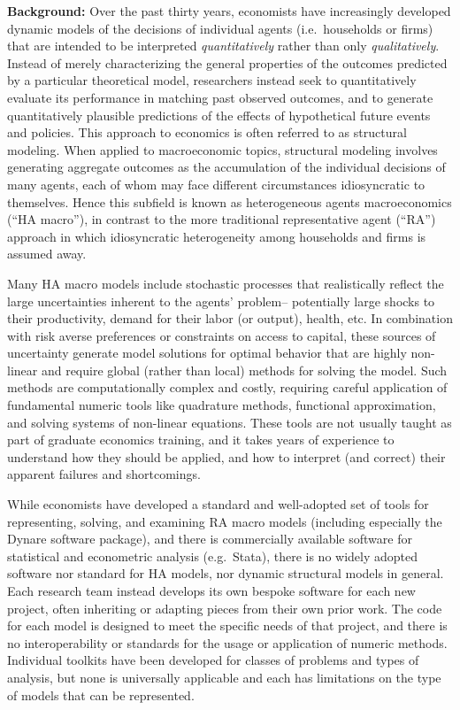 \documentclass[12pt,pdftex,letterpaper]{article}
\begin{document}
\noindent \textbf{Background:} Over the past thirty years, economists have increasingly developed dynamic models of the decisions of individual agents (i.e.\ households or firms) that are intended to be interpreted \textit{quantitatively} rather than only \textit{qualitatively}. Instead of merely characterizing the general properties of the outcomes predicted by a particular theoretical model, researchers instead seek to quantitatively evaluate its performance in matching past observed outcomes, and to generate quantitatively plausible predictions of the effects of hypothetical future events and policies. This approach to economics is often referred to as structural modeling. When applied to macroeconomic topics, structural modeling involves generating aggregate outcomes as the accumulation of the individual decisions of many agents, each of whom may face different circumstances idiosyncratic to themselves. Hence this subfield is known as heterogeneous agents macroeconomics (``HA macro''), in contrast to the more traditional representative agent (``RA'') approach in which idiosyncratic heterogeneity among households and firms is assumed away.

Many HA macro models include stochastic processes that realistically reflect the large uncertainties inherent to the agents' problem-- potentially large shocks to their productivity, demand for their labor (or output), health, etc. In combination with risk averse preferences or constraints on access to capital, these sources of uncertainty generate model solutions for optimal behavior that are highly non-linear and require global (rather than local) methods for solving the model. Such methods are computationally complex and costly, requiring careful application of fundamental numeric tools like quadrature methods, functional approximation, and solving systems of non-linear equations. These tools are not usually taught as part of graduate economics training, and it takes years of experience to understand how they should be applied, and how to interpret (and correct) their apparent failures and shortcomings.

While economists have developed a standard and well-adopted set of tools for representing, solving, and examining RA macro models (including especially the Dynare software package), and there is commercially available software for statistical and econometric analysis (e.g.\ Stata), there is no widely adopted software nor standard for HA models, nor dynamic structural models in general. Each research team instead develops its own bespoke software for each new project, often inheriting or adapting pieces from their own prior work. The code for each model is designed to meet the specific needs of that project, and there is no interoperability or standards for the usage or application of numeric methods. Individual toolkits have been developed for classes of problems and types of analysis, but none is universally applicable and each has limitations on the type of models that can be represented.
\end{document}
